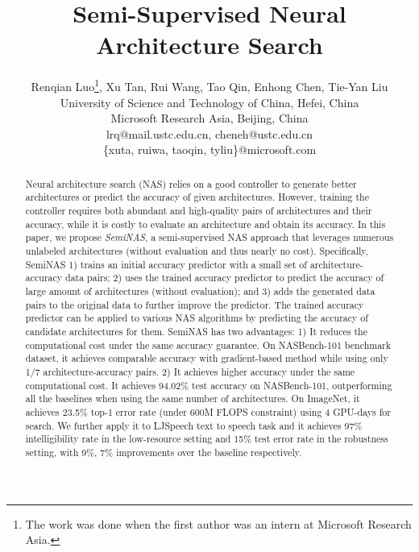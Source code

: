 \documentclass{article}
\title{Semi-Supervised Neural Architecture Search}
\author{
  Renqian Luo\thanks{The work was done when the first author was an intern at Microsoft Research Asia.}, Xu Tan, Rui Wang, Tao Qin, Enhong Chen, Tie-Yan Liu\\
  University of Science and Technology of China, Hefei, China\\
  Microsoft Research Asia, Beijing, China\\
  lrq@mail.ustc.edu.cn,\; cheneh@ustc.edu.cn\\
  \{xuta, ruiwa, taoqin, tyliu\}@microsoft.com
}
\begin{document}
\maketitle

\begin{abstract}
Neural architecture search (NAS) relies on a good controller to generate better architectures or predict the accuracy of given architectures. However, training the controller requires both abundant and high-quality pairs of architectures and their accuracy, while it is costly to evaluate an architecture and obtain its accuracy. In this paper, we propose \emph{SemiNAS}, a semi-supervised NAS approach that leverages numerous unlabeled architectures (without evaluation and thus nearly no cost). Specifically, SemiNAS 1) trains an initial accuracy predictor with a small set of architecture-accuracy data pairs; 2) uses the trained accuracy predictor to predict the accuracy of large amount of architectures (without evaluation); and 3) adds the generated data pairs to the original data to further improve the predictor. The trained accuracy predictor can be applied to various NAS algorithms by predicting the accuracy of candidate architectures for them. SemiNAS has two advantages: 1) It reduces the computational cost under the same accuracy guarantee. On NASBench-101 benchmark dataset, it achieves comparable accuracy with gradient-based method while using only 1/7 architecture-accuracy pairs. 2) It achieves higher accuracy under the same computational cost. It achieves 94.02\% test accuracy on NASBench-101, outperforming all the baselines when using the same number of architectures. On ImageNet, it achieves 23.5\% top-1 error rate (under 600M FLOPS constraint) using 4 GPU-days for search. We further apply it to LJSpeech text to speech task and it achieves 97\% intelligibility rate in the low-resource setting and 15\% test error rate in the robustness setting, with 9\%, 7\% improvements over the baseline respectively.
\end{abstract}
\end{document}

